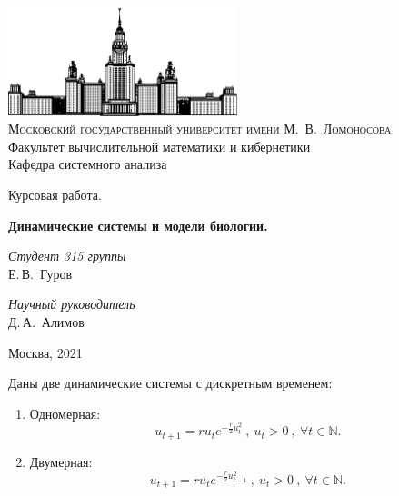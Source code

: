 \documentclass[10pt]{article}
\numberwithin{equation}{section}
\begin{document}
\thispagestyle{empty}

\begin{center}
\ \vspace{-3cm}

\includegraphics[width=0.5\textwidth]{msu.png}\\
{\scshape Московский государственный университет имени М.~В.~Ломоносова}\\
Факультет вычислительной математики и кибернетики\\
Кафедра системного анализа

\vfill

{\LARGE Курсовая работа. }

\vspace{1cm}

{\Huge\bfseries Динамические системы и модели биологии.}
\end{center}

\vspace{1cm}

\begin{flushright}
  \large
  \textit{Студент 315 группы}\\
  Е.\,В.~Гуров

  \vspace{5mm}

  \textit{Научный руководитель}\\
  Д.\,А.~Алимов
\end{flushright}

\vfill

\begin{center}
Москва, 2021
\end{center}
\newpage

\tableofcontents
\newpage

\setcounter{section}{1}

Даны две динамические системы с дискретным временем:
\begin{enumerate}
	\item Одномерная:
	\begin{equation} \label{first_system}
		u_{t+1} = ru_te^{-\frac{r}{2}u_t^2} \ , \ u_t > 0 \  , \ \forall t \in \mathbb{N}.
	\end{equation}
	\item Двумерная:
	\begin{equation} \label{second_system}
		u_{t+1} = ru_te^{-\frac{r}{2}u_{t-1}^2} \ , \ u_t > 0 \  , \ \forall t \in \mathbb{N}.
	\end{equation}
\end{enumerate}
\end{document}
